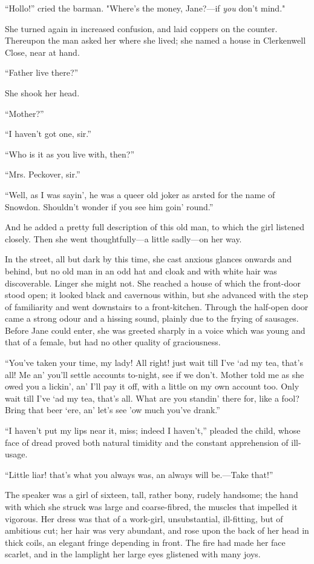 ``Hollo!'' cried the barman. "Where's the money, Jane?---if \emph{you}
don't mind."

{}She turned again in increased confusion, and laid coppers on the
counter. Thereupon the man asked her where she lived; she named a house
in Clerkenwell Close, near at hand.

``Father live there?''

She shook her head.

``Mother?''

``I haven't got one, sir.''

``Who is it as you live with, then?''

``Mrs. Peckover, sir.''

``Well, as I was sayin', he was a queer old joker as arsted for the name
of Snowdon. Shouldn't wonder if you see him goin' round.''

And he added a pretty full description of this old man, to which the
girl listened closely. Then she went thoughtfully---a little sadly---on
her way.

In the street, all but dark by this time, she cast anxious glances
onwards and behind, but no old man in an odd hat and cloak and with
white hair was discoverable. Linger she might not. She reached a house
of which the front-door stood open; it looked {}black and cavernous
within, but she advanced with the step of familiarity and went
downstairs to a front-kitchen. Through the half-open door came a strong
odour and a hissing sound, plainly due to the frying of sausages. Before
Jane could enter, she was greeted sharply in a voice which was young and
that of a female, but had no other quality of graciousness.

``You've taken your time, my lady! All right! just wait till I've `ad my
tea, that's all! Me an' you'll settle accounts to-night, see if we
don't. Mother told me as she owed you a lickin', an' I'll pay it off,
with a little on my own account too. Only wait till I've `ad my tea,
that's all. What are you standin' there for, like a fool? Bring that
beer `ere, an' let's see 'ow much you've drank.''

``I haven't put my lips near it, miss; indeed I haven't,'' pleaded the
child, whose face of dread proved both natural timidity and the constant
apprehension of ill-usage.

``Little liar! that's what you always was, an always will be.---Take
that!''

{}The speaker was a girl of sixteen, tall, rather bony, rudely handsome;
the hand with which she struck was large and coarse-fibred, the muscles
that impelled it vigorous. Her dress was that of a work-girl,
unsubstantial, ill-fitting, but of ambitious cut; her hair was very
abundant, and rose upon the back of her head in thick coils, an elegant
fringe depending in front. The fire had made her face scarlet, and in
the lamplight her large eyes glistened with many joys.

